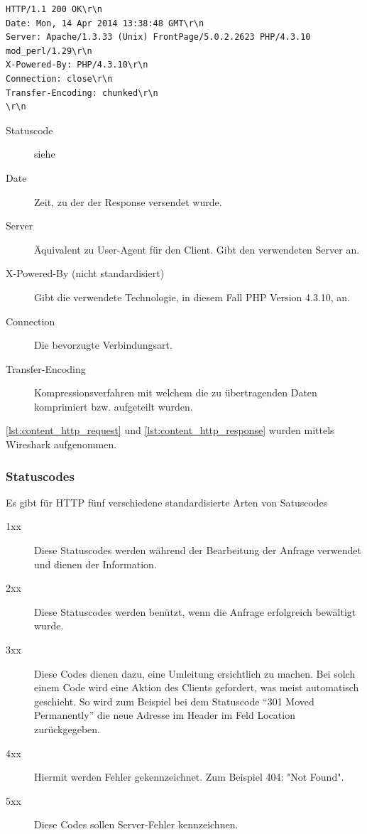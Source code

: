 \begin{lstlisting}[style=custom, caption={HTTP-Response},label={lst:content_http_response}]
HTTP/1.1 200 OK\r\n
Date: Mon, 14 Apr 2014 13:38:48 GMT\r\n
Server: Apache/1.3.33 (Unix) FrontPage/5.0.2.2623 PHP/4.3.10 mod_perl/1.29\r\n
X-Powered-By: PHP/4.3.10\r\n
Connection: close\r\n
Transfer-Encoding: chunked\r\n
\r\n
\end{lstlisting}
\begin{description}
\item[Statuscode] siehe 
\item[Date] Zeit, zu der der Response versendet wurde.
\item[Server] Äquivalent zu User-Agent für den Client. Gibt den verwendeten Server an. 
\item[X-Powered-By (nicht standardisiert)] Gibt die verwendete Technologie, in diesem Fall PHP Version 4.3.10, an. 
\item[Connection] Die bevorzugte Verbindungsart.
\item[Transfer-Encoding] Kompressionsverfahren mit welchem die zu übertragenden Daten komprimiert bzw. aufgeteilt wurden.
\end{description}
\autoref{lst:content_http_request} und \autoref{lst:content_http_response} wurden mittels Wireshark aufgenommen.
\subsubsection{Statuscodes}
\label{sec:content_http_statuscodes}
Es gibt für HTTP fünf verschiedene standardisierte Arten von Satuscodes
\begin{description}
\item[1xx] Diese Statuscodes werden während der Bearbeitung der Anfrage verwendet und dienen der Information.
\item[2xx] Diese Statuscodes werden benützt, wenn die Anfrage erfolgreich bewältigt wurde.  
\item[3xx] Diese Codes dienen dazu, eine Umleitung ersichtlich zu machen. Bei solch einem Code wird eine Aktion des Clients gefordert, was meist automatisch geschieht. So wird zum Beispiel bei dem Statuscode \enquote{301 Moved Permanently} die neue Adresse im Header im Feld Location zurückgegeben.
\item[4xx] Hiermit werden Fehler gekennzeichnet. Zum Beispiel 404: "Not Found".
\item[5xx] Diese Codes sollen Server-Fehler kennzeichnen.
\end{description}


